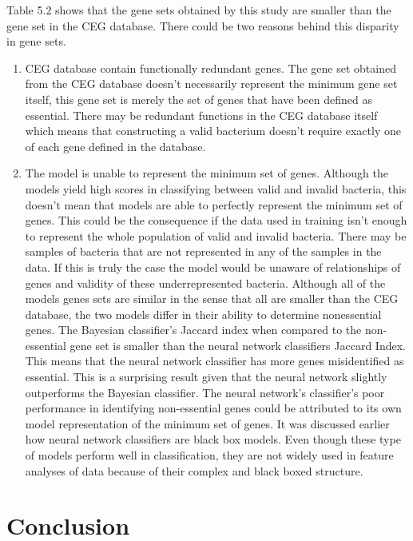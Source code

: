 \documentclass[]{report}
\begin{document}
Table 5.2 shows that the gene sets obtained by this study are smaller
than the gene set in the CEG database. There could be two reasons behind
this disparity in gene sets.

\begin{enumerate}
\def\labelenumi{(\arabic{enumi})}
\item
  CEG database contain functionally redundant genes. The gene set
  obtained from the CEG database doesn't necessarily represent the
  minimum gene set itself, this gene set is merely the set of genes that
  have been defined as essential. There may be redundant functions in
  the CEG database itself which means that constructing a valid
  bacterium doesn't require exactly one of each gene defined in the
  database.
\item
  The model is unable to represent the minimum set of genes. Although
  the models yield high scores in classifying between valid and invalid
  bacteria, this doesn't mean that models are able to perfectly
  represent the minimum set of genes. This could be the consequence if
  the data used in training isn't enough to represent the whole
  population of valid and invalid bacteria. There may be samples of
  bacteria that are not represented in any of the samples in the data.
  If this is truly the case the model would be unaware of relationships
  of genes and validity of these underrepresented bacteria. Although all
  of the models genes sets are similar in the sense that all are smaller
  than the CEG database, the two models differ in their ability to
  determine nonessential genes. The Bayesian classifier's Jaccard index
  when compared to the non-essential gene set is smaller than the neural
  network classifiers Jaccard Index. This means that the neural network
  classifier has more genes misidentified as essential. This is a
  surprising result given that the neural network slightly outperforms
  the Bayesian classifier. The neural network's classifier's poor
  performance in identifying non-essential genes could be attributed to
  its own model representation of the minimum set of genes. It was
  discussed earlier how neural network classifiers are black box models.
  Even though these type of models perform well in classification, they
  are not widely used in feature analyses of data because of their
  complex and black boxed structure.
\end{enumerate}

\chapter{Conclusion}\label{conclusion}
\end{document}
